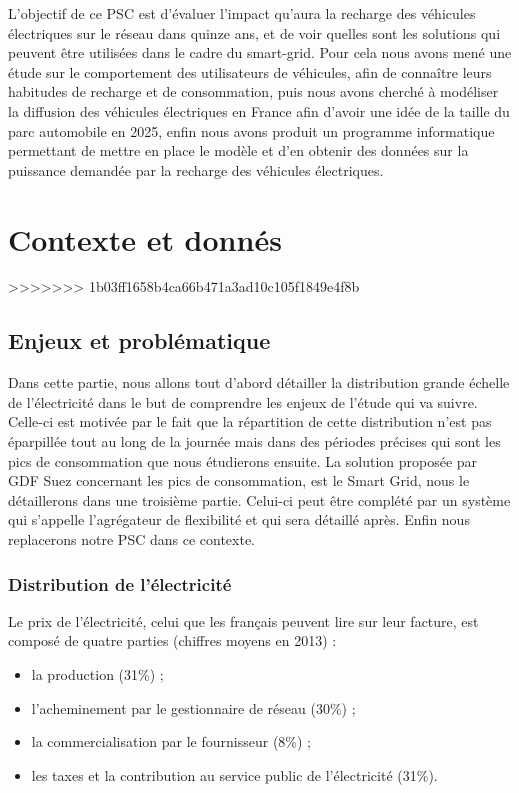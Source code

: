 \documentclass[10pt]{article}
\begin{document}
L'objectif de ce PSC est d'évaluer l'impact qu'aura la recharge des véhicules électriques sur le réseau dans quinze ans, et de voir quelles sont les solutions qui peuvent être utilisées dans le cadre du smart-grid. Pour cela nous avons mené une étude sur le comportement des utilisateurs de véhicules, afin de connaître leurs habitudes de recharge et de consommation, puis nous avons cherché à modéliser la diffusion des véhicules électriques en France afin d'avoir une idée de la taille du parc automobile en 2025, enfin nous avons produit un programme informatique permettant de mettre en place le modèle et d'en obtenir des données sur la puissance demandée par la recharge des véhicules électriques.

\section{Contexte et donn\'es}
>>>>>>> 1b03ff1658b4ca66b471a3ad10c105f1849e4f8b

	\subsection{Enjeux et probl\'ematique}
	
		Dans cette partie, nous allons tout d’abord détailler la distribution grande échelle de l’électricité dans le but de comprendre les enjeux de l’étude qui va suivre. Celle-ci est motivée par le fait que la répartition de cette distribution n’est pas éparpillée tout au long de la journée mais dans des périodes précises qui sont les pics de consommation que nous étudierons ensuite. La solution proposée par GDF Suez concernant les pics de consommation, est le Smart Grid, nous le détaillerons dans une troisième partie. Celui-ci peut être complété par un système qui s’appelle l’agrégateur de flexibilité et qui sera détaillé après. Enfin nous replacerons notre PSC dans ce contexte.
		
		\subsubsection{Distribution de l'électricité}
		
			Le prix de l'électricité, celui que les français peuvent lire sur leur facture, est composé de quatre parties (chiffres moyens en 2013) :
			\begin{itemize}
				\item la production (31\%) ;
				\item l'acheminement par le gestionnaire de réseau (30\%) ;
				\item la commercialisation par le fournisseur (8\%) ;
				\item les taxes et la contribution au service public de l'électricité (31\%).
			\end{itemize}
			
\end{document}
